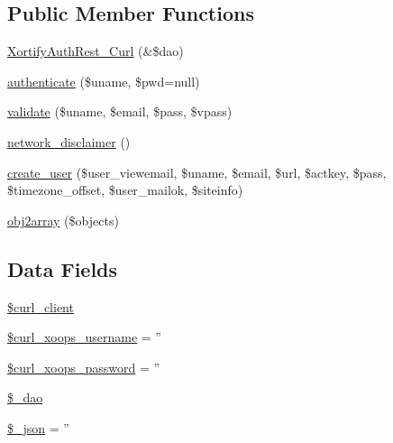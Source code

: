 \subsection*{Public Member Functions}
\begin{DoxyCompactItemize}
\item 
\hyperlink{class_xortify_auth_rest___curl_af9b64b3967386563a2384fba32486ad2}{Xortify\-Auth\-Rest\-\_\-\-Curl} (\&\$dao)
\item 
\hyperlink{class_xortify_auth_rest___curl_a00678ba307326b734e6c679f28bea315}{authenticate} (\$uname, \$pwd=null)
\item 
\hyperlink{class_xortify_auth_rest___curl_a91121a1b702dfd20fb65a027c8ed26ec}{validate} (\$uname, \$email, \$pass, \$vpass)
\item 
\hyperlink{class_xortify_auth_rest___curl_a1874c27b6f81a3f2ff9015405ad0f8bc}{network\-\_\-disclaimer} ()
\item 
\hyperlink{class_xortify_auth_rest___curl_ac72efc5ad313a592cf6706876f56f7ec}{create\-\_\-user} (\$user\-\_\-viewemail, \$uname, \$email, \$url, \$actkey, \$pass, \$timezone\-\_\-offset, \$user\-\_\-mailok, \$siteinfo)
\item 
\hyperlink{class_xortify_auth_rest___curl_aabc52e4f78557f0e0b360a8aaba6e11d}{obj2array} (\$objects)
\end{DoxyCompactItemize}
\subsection*{Data Fields}
\begin{DoxyCompactItemize}
\item 
\hyperlink{class_xortify_auth_rest___curl_a402f2112991f3227835af80e9df33e38}{\$curl\-\_\-client}
\item 
\hyperlink{class_xortify_auth_rest___curl_aab7480ba9f878a02b2c9fd43922fa070}{\$curl\-\_\-xoops\-\_\-username} = ''
\item 
\hyperlink{class_xortify_auth_rest___curl_a6c9851541ed3826c67cfe7224c38f0b8}{\$curl\-\_\-xoops\-\_\-password} = ''
\item 
\hyperlink{class_xortify_auth_rest___curl_a12a029c610f699b4b25e79a1f64a3485}{\$\-\_\-dao}
\item 
\hyperlink{class_xortify_auth_rest___curl_a94787b37d92a2dee02534eed4f316589}{\$\-\_\-json} = ''
\end{DoxyCompactItemize}


